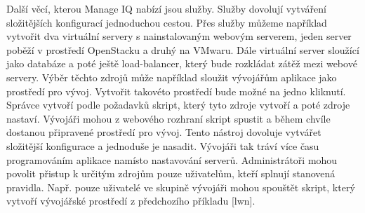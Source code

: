     Další věcí, kterou Manage IQ nabízí jsou služby. Služby dovolují vytváření složitějších konfigurací jednoduchou cestou. Přes služby můžeme například vytvořit dva virtuální servery s nainstalovaným webovým serverem, jeden server poběží v prostředí OpenStacku a druhý na VMwaru. Dále virtuální server sloužící jako databáze a poté ještě load-balancer, který bude rozkládat zátěž mezi webové servery. Výběr těchto zdrojů může například sloužit vývojářům aplikace jako prostředí pro vývoj. Vytvořit takovéto prostředí bude možné na jedno kliknutí. Správce vytvoří podle požadavků skript, který tyto zdroje vytvoří a poté zdroje nastaví. Vývojáři mohou z webového rozhraní skript spustit a během chvíle dostanou připravené prostředí pro vývoj. Tento nástroj dovoluje vytvářet složitější konfigurace a jednoduše je nasadit. Vývojáři tak tráví více času programováním aplikace namísto nastavování serverů. Administrátoři mohou povolit přistup k určitým zdrojům pouze uživatelům, kteří splnují stanovená pravidla. Např. pouze uživatelé ve skupině vývojáři mohou spouštět skript, který vytvoří vývojářské prostředí z předchozího příkladu [lwn].

